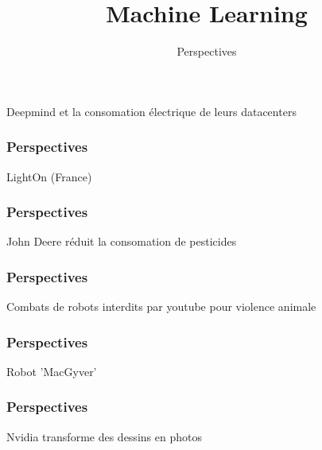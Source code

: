 \documentclass{formation}
\title{Machine Learning}
\subtitle{Perspectives}
\begin{document}
\maketitle

\begin{frame}
  \frametitle{}
  Deepmind et la consomation électrique de leurs datacenters
\end{frame}

\begin{frame}
  \frametitle{Perspectives}
  LightOn (France) 
\end{frame}

\begin{frame}
  \frametitle{Perspectives}
  John Deere réduit la consomation de pesticides
\end{frame}

\begin{frame}
  \frametitle{Perspectives}
  Combats de robots interdits par youtube pour violence animale
\end{frame}

\begin{frame}
  \frametitle{Perspectives}
  Robot 'MacGyver'
\end{frame}

\begin{frame}
  \frametitle{Perspectives}
  Nvidia transforme des dessins en photos
\end{frame}
\end{document}
